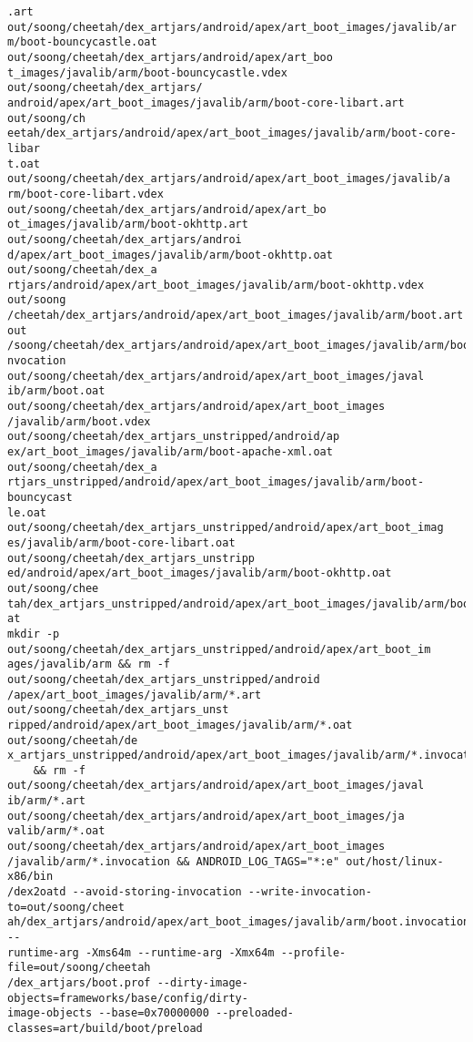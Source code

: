 \begin{lstlisting}
.art out/soong/cheetah/dex_artjars/android/apex/art_boot_images/javalib/ar
m/boot-bouncycastle.oat out/soong/cheetah/dex_artjars/android/apex/art_boo
t_images/javalib/arm/boot-bouncycastle.vdex out/soong/cheetah/dex_artjars/
android/apex/art_boot_images/javalib/arm/boot-core-libart.art out/soong/ch
eetah/dex_artjars/android/apex/art_boot_images/javalib/arm/boot-core-libar
t.oat out/soong/cheetah/dex_artjars/android/apex/art_boot_images/javalib/a
rm/boot-core-libart.vdex out/soong/cheetah/dex_artjars/android/apex/art_bo
ot_images/javalib/arm/boot-okhttp.art out/soong/cheetah/dex_artjars/androi
d/apex/art_boot_images/javalib/arm/boot-okhttp.oat out/soong/cheetah/dex_a
rtjars/android/apex/art_boot_images/javalib/arm/boot-okhttp.vdex out/soong
/cheetah/dex_artjars/android/apex/art_boot_images/javalib/arm/boot.art out
/soong/cheetah/dex_artjars/android/apex/art_boot_images/javalib/arm/boot.i
nvocation out/soong/cheetah/dex_artjars/android/apex/art_boot_images/javal
ib/arm/boot.oat out/soong/cheetah/dex_artjars/android/apex/art_boot_images
/javalib/arm/boot.vdex out/soong/cheetah/dex_artjars_unstripped/android/ap
ex/art_boot_images/javalib/arm/boot-apache-xml.oat out/soong/cheetah/dex_a
rtjars_unstripped/android/apex/art_boot_images/javalib/arm/boot-bouncycast
le.oat out/soong/cheetah/dex_artjars_unstripped/android/apex/art_boot_imag
es/javalib/arm/boot-core-libart.oat out/soong/cheetah/dex_artjars_unstripp
ed/android/apex/art_boot_images/javalib/arm/boot-okhttp.oat out/soong/chee
tah/dex_artjars_unstripped/android/apex/art_boot_images/javalib/arm/boot.o
at
mkdir -p out/soong/cheetah/dex_artjars_unstripped/android/apex/art_boot_im
ages/javalib/arm && rm -f out/soong/cheetah/dex_artjars_unstripped/android
/apex/art_boot_images/javalib/arm/*.art out/soong/cheetah/dex_artjars_unst
ripped/android/apex/art_boot_images/javalib/arm/*.oat out/soong/cheetah/de
x_artjars_unstripped/android/apex/art_boot_images/javalib/arm/*.invocation
    && rm -f out/soong/cheetah/dex_artjars/android/apex/art_boot_images/javal
ib/arm/*.art out/soong/cheetah/dex_artjars/android/apex/art_boot_images/ja
valib/arm/*.oat out/soong/cheetah/dex_artjars/android/apex/art_boot_images
/javalib/arm/*.invocation && ANDROID_LOG_TAGS="*:e" out/host/linux-x86/bin
/dex2oatd --avoid-storing-invocation --write-invocation-to=out/soong/cheet
ah/dex_artjars/android/apex/art_boot_images/javalib/arm/boot.invocation --
runtime-arg -Xms64m --runtime-arg -Xmx64m --profile-file=out/soong/cheetah
/dex_artjars/boot.prof --dirty-image-objects=frameworks/base/config/dirty-
image-objects --base=0x70000000 --preloaded-classes=art/build/boot/preload

\end{lstlisting}
